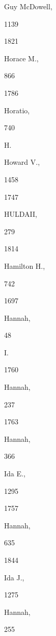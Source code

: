 {Guy McDowell, 


1139 


1821 


Horace M., 


866 








1786 


Horatio, 


740 




H. 






Howard V., 


1458 








1747 


HULDAII, 


279 


1814 


Hamilton H., 


742 








1697 


Hannah, 


48 




I. 




1760 


Hannah, 


237 








1763 


Hannah, 


366 




Ida E., 


1295 


1757 


Hannah, 


635 


1844 


Ida J., 


1275 




Hannah, 


255 


}
